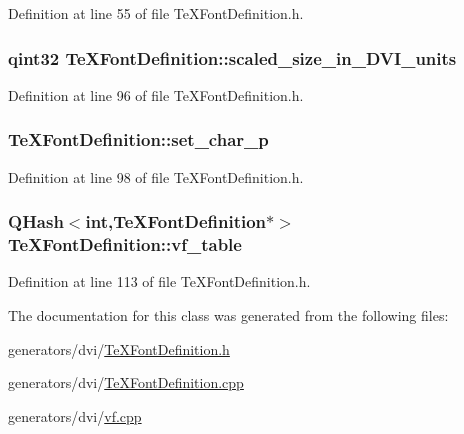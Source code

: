 Definition at line 55 of file Te\+X\+Font\+Definition.\+h.

\hypertarget{classTeXFontDefinition_a8514a1b74d448c5e9e9dafc8737938e9}{
\subsubsection[{scaled\+\_\+size\+\_\+in\+\_\+\+D\+V\+I\+\_\+units}]{\setlength{\rightskip}{0pt plus 5cm}qint32 Te\+X\+Font\+Definition\+::scaled\+\_\+size\+\_\+in\+\_\+\+D\+V\+I\+\_\+units}}\label{classTeXFontDefinition_a8514a1b74d448c5e9e9dafc8737938e9}


Definition at line 96 of file Te\+X\+Font\+Definition.\+h.

\hypertarget{classTeXFontDefinition_a2901636eeb7920b42396cdbdd3f93774}{
\subsubsection[{set\+\_\+char\+\_\+p}]{ Te\+X\+Font\+Definition\+::set\+\_\+char\+\_\+p}}\label{classTeXFontDefinition_a2901636eeb7920b42396cdbdd3f93774}


Definition at line 98 of file Te\+X\+Font\+Definition.\+h.

\hypertarget{classTeXFontDefinition_a5cbb8fb4966c6f2488053eb7b4abbfed}{
\subsubsection[{vf\+\_\+table}]{\setlength{\rightskip}{0pt plus 5cm}Q\+Hash$<$int,{\bf Te\+X\+Font\+Definition}$\ast$$>$ Te\+X\+Font\+Definition\+::vf\+\_\+table}}\label{classTeXFontDefinition_a5cbb8fb4966c6f2488053eb7b4abbfed}


Definition at line 113 of file Te\+X\+Font\+Definition.\+h.



The documentation for this class was generated from the following files\+:\begin{DoxyCompactItemize}
\item 
generators/dvi/\hyperlink{TeXFontDefinition_8h}{Te\+X\+Font\+Definition.\+h}\item 
generators/dvi/\hyperlink{TeXFontDefinition_8cpp}{Te\+X\+Font\+Definition.\+cpp}\item 
generators/dvi/\hyperlink{vf_8cpp}{vf.\+cpp}\end{DoxyCompactItemize}
